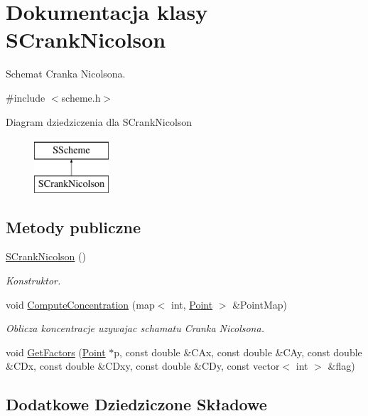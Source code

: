 \hypertarget{class_s_crank_nicolson}{}\section{Dokumentacja klasy S\+Crank\+Nicolson}
\label{class_s_crank_nicolson}


Schemat Cranka Nicolsona.  




{\ttfamily \#include $<$scheme.\+h$>$}

Diagram dziedziczenia dla S\+Crank\+Nicolson\begin{figure}[H]
\begin{center}
\leavevmode
\includegraphics[height=2.000000cm]{class_s_crank_nicolson}
\end{center}
\end{figure}
\subsection*{Metody publiczne}
\begin{DoxyCompactItemize}
\item 
\hyperlink{class_s_crank_nicolson_a914a9f8786b91fd4ceae1a9f0e99cff8}{S\+Crank\+Nicolson} ()
\begin{DoxyCompactList}\small\item\em Konstruktor. \end{DoxyCompactList}\item 
void \hyperlink{class_s_crank_nicolson_abe37e0a2d5078a17420b3e9d815fc85f}{Compute\+Concentration} (map$<$ int, \hyperlink{class_point}{Point} $>$ \&Point\+Map)
\begin{DoxyCompactList}\small\item\em Oblicza koncentracje uzywajac schamatu Cranka Nicolsona. \end{DoxyCompactList}\item 
void \hyperlink{class_s_crank_nicolson_a1fd8e8aee2c7fb9f61e6c4b02b74e1b3}{Get\+Factors} (\hyperlink{class_point}{Point} $\ast$p, const double \&C\+Ax, const double \&C\+Ay, const double \&C\+Dx, const double \&C\+Dxy, const double \&C\+Dy, const vector$<$ int $>$ \&flag)
\end{DoxyCompactItemize}
\subsection*{Dodatkowe Dziedziczone Składowe}


